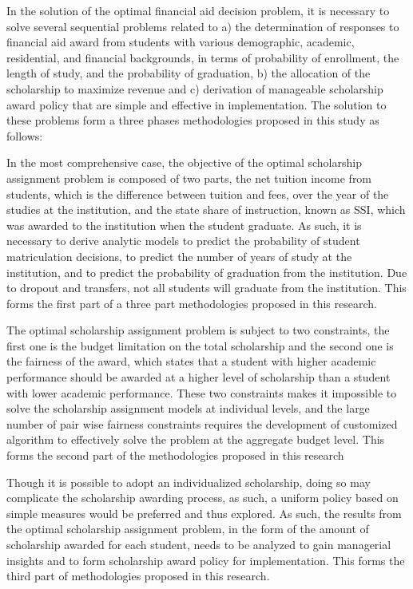 \documentclass[12pt,english]{report}
\begin{document}
In the solution of the optimal financial aid decision problem,  it is necessary
to solve several sequential problems related to a) the determination of
responses to financial aid award from students with various demographic,
academic, residential, and financial backgrounds, in terms of probability of
enrollment, the length of study, and the probability of graduation, b) the
allocation of the scholarship to maximize revenue and c) derivation of
manageable scholarship award policy that are simple and effective in
implementation.  The solution to these problems form a three phases
methodologies proposed in this study as follows:


In the most comprehensive case, the objective of the optimal scholarship
assignment problem is composed of two parts, the net tuition income from
students, which is the difference between tuition and fees, over the year of the
studies at the institution, and the state share of instruction, known as SSI,
which was awarded to the institution when the student graduate.  As such,  it
is necessary to derive analytic models to predict the probability of student
matriculation decisions, to predict the number of years of study at the
institution, and to predict the probability of graduation from the institution.
Due to dropout and transfers, not all students will graduate from the
institution.  This forms the first part of a three part methodologies proposed
in this research.

The optimal scholarship assignment problem is subject to two constraints, the
first one is the budget limitation on the total scholarship and the second one
is the fairness of the award, which states that  a student with higher
academic performance should be awarded at a higher level of scholarship than
a student with lower academic performance.  These two constraints makes it
impossible to solve the scholarship assignment models at individual levels, and
the large number of pair wise fairness constraints requires the development of
customized algorithm to effectively solve the problem at the aggregate budget
level.  This forms the second part of the methodologies proposed in this research

Though it is possible to adopt an individualized scholarship, doing so may
complicate the scholarship awarding process, as such, a uniform policy based on
simple measures would be preferred and thus explored.  As such, the results
from the optimal scholarship assignment problem, in the form of the  amount of
scholarship awarded for each student, needs to be analyzed to gain managerial
insights and to form scholarship award policy for implementation.  This forms
the third part of methodologies proposed in this research.
\end{document}
